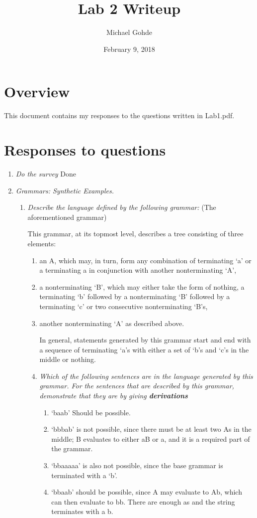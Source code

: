 \documentclass[12pt,letterpaper]{article}
\begin{document}
\title{Lab 2 Writeup}
\author{Michael Gohde}
\date{February 9, 2018}
\maketitle

\section{Overview}
This document contains my responses to the questions written in Lab1.pdf.

\section{Responses to questions}
\begin{enumerate}
\item \textit{Do the survey}
Done

\item \textit{Grammars: Synthetic Examples.}
\begin{enumerate}
    \item \textit{Describe the language defined by the following grammar:}
    (The aforementioned grammar)
    
    This grammar, at its topmost level, describes a tree consisting of three elements: 
    \begin{enumerate}
    \item an A, which may, in turn, form any combination of terminating `a' or a terminating a in conjunction with another nonterminating `A', 
    \item a nonterminating `B', which may either take the form of nothing, a terminating `b' followed by a nonterminating `B' followed by a terminating `c' or two consecutive nonterminating `B's, 
    \item another nonterminating `A' as described above.
    
    In general, statements generated by this grammar start and end with a sequence of terminating `a's with either a set of `b's and `c's in the middle or nothing.
    
    \item \textit{Which of the following sentences are in the language generated by this grammar. For the sentences that are described by this grammar, demonstrate that they are by giving \textbf{derivations}}
    
    \begin{enumerate}
    \item `baab' Should be possible.
    \item `bbbab' is not possible, since there must be at least two As in the middle; B evaluates to either aB or a, and it is a required part of the grammar.
    \item `bbaaaaa' is also not possible, since the base grammar is terminated with a `b'.
    \item `bbaab' should be possible, since A may evaluate to Ab, which can then evaluate to bb. There are enough as and the string terminates with a b.
    \end{enumerate}
    

\end{enumerate}
\end{enumerate}
\end{enumerate}
\end{document}
